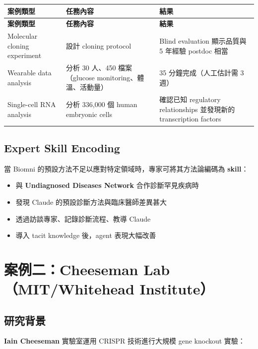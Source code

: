 \documentclass[12pt,a4paper]{article}
\begin{document}
\begin{longtable}{p{3.5cm}p{5cm}p{5cm}}
\toprule
\textbf{案例類型} & \textbf{任務內容} & \textbf{結果} \\
\midrule
\endfirsthead

\toprule
\textbf{案例類型} & \textbf{任務內容} & \textbf{結果} \\
\midrule
\endhead

\bottomrule
\endfoot

Molecular cloning experiment & 設計 cloning protocol & Blind evaluation 顯示品質與 5 年經驗 postdoc 相當 \\
\midrule
Wearable data analysis & 分析 30 人、450 檔案（glucose monitoring、體溫、活動量） & 35 分鐘完成（人工估計需 3 週） \\
\midrule
Single-cell RNA analysis & 分析 336,000 個 human embryonic cells & 確認已知 regulatory relationships 並發現新的 transcription factors \\
\bottomrule
\end{longtable}

\subsection{Expert Skill Encoding}

當 Biomni 的預設方法不足以應對特定領域時，專家可將其方法論編碼為 \textbf{skill}：

\begin{itemize}
    \item 與 \textbf{Undiagnosed Diseases Network} 合作診斷罕見疾病時
    \item 發現 Claude 的預設診斷方法與臨床醫師差異甚大
    \item 透過訪談專家、記錄診斷流程、教導 Claude
    \item 導入 tacit knowledge 後，agent 表現大幅改善
\end{itemize}

\section{案例二：Cheeseman Lab（MIT/Whitehead Institute）}

\subsection{研究背景}

\textbf{Iain Cheeseman} 實驗室運用 CRISPR 技術進行大規模 gene knockout 實驗：
\end{document}
